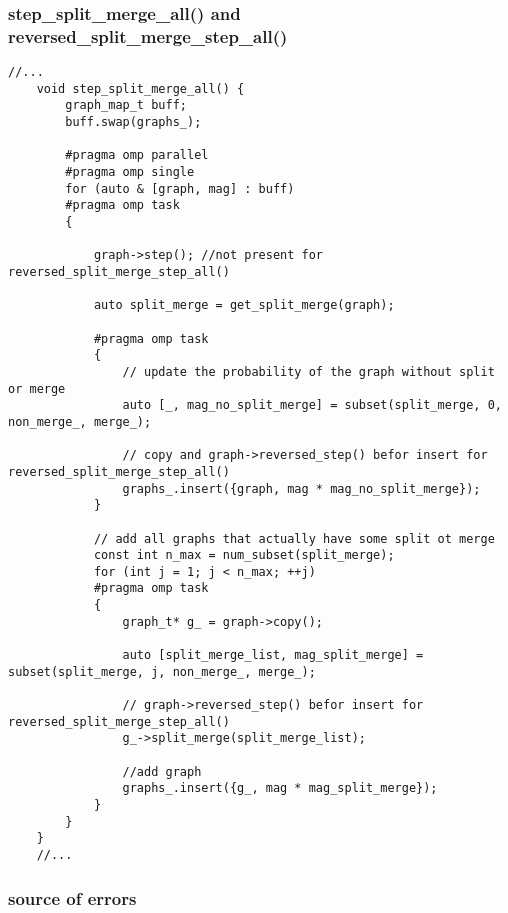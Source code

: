 \documentclass[11pt]{article}
\begin{document}
\subsubsection{step\_split\_merge\_all() and reversed\_split\_merge\_step\_all()}

\begin{lstlisting}[style=CStyle]
	//...
	void step_split_merge_all() {
		graph_map_t buff;
		buff.swap(graphs_);

		#pragma omp parallel
		#pragma omp single
		for (auto & [graph, mag] : buff)
		#pragma omp task
	  	{
	  		
	  		graph->step(); //not present for reversed_split_merge_step_all()

	  		auto split_merge = get_split_merge(graph);

	  		#pragma omp task
	  		{
	  			// update the probability of the graph without split or merge 
				auto [_, mag_no_split_merge] = subset(split_merge, 0, non_merge_, merge_);
				
				// copy and graph->reversed_step() befor insert for reversed_split_merge_step_all()
				graphs_.insert({graph, mag * mag_no_split_merge});
	  		}

	  		// add all graphs that actually have some split ot merge 
	  		const int n_max = num_subset(split_merge);
	  		for (int j = 1; j < n_max; ++j)
	  		#pragma omp task
	  		{
	  			graph_t* g_ = graph->copy();

	  			auto [split_merge_list, mag_split_merge] = subset(split_merge, j, non_merge_, merge_);
	  			
	  			// graph->reversed_step() befor insert for reversed_split_merge_step_all()
	  			g_->split_merge(split_merge_list); 

	  			//add graph
	  			graphs_.insert({g_, mag * mag_split_merge});
	  		}
	  	}
	}
	//...
\end{lstlisting}

\subsubsection{source of errors}
\end{document}
